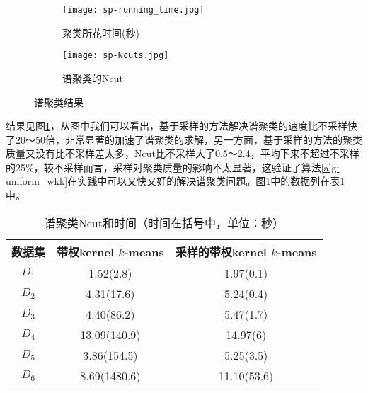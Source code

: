 \begin{figure}[h]
	\begin{subfigure}{.47\linewidth}
		\texttt{[image: sp-running\_time.jpg]}
		\caption{聚类所花时间(秒)}
	\end{subfigure}
	\begin{subfigure}{.47\linewidth}
		\texttt{[image: sp-Ncuts.jpg]}
		\caption{谱聚类的Ncut}
	\end{subfigure}
    \caption{谱聚类结果}
    \label{fig: sp-experiments}
\end{figure}
结果见图\ref{fig: sp-experiments}，从图中我们可以看出，基于采样的方法解决谱聚类的速度比不采样快了20～50倍，非常显著的加速了谱聚类的求解，另一方面，基于采样的方法的聚类质量又没有比不采样差太多，Ncut比不采样大了0.5～2.4，平均下来不超过不采样的25\%，较不采样而言，采样对聚类质量的影响不太显著，这验证了算法\ref{alg: uniform_wkk}在实践中可以又快又好的解决谱聚类问题。图\ref{fig: sp-experiments}中的数据列在表\ref{tab: res_spectral_cls}中。
\begin{table}[h]
	\caption{谱聚类Ncut和时间（时间在括号中，单位：秒）}
	\label{tab: res_spectral_cls}
	\begin{tabular}{ccc}
		\toprule
		数据集 & 带权kernel $k$-means & 采样的带权kernel $k$-means \\
		\midrule
		$D_1$ & 1.52(2.8) & 1.97(0.1) \\
		$D_2$ & 4.31(17.6) & 5.24(0.4) \\
		$D_3$ & 4.40(86.2) & 5.47(1.7) \\
		$D_4$ & 13.09(140.9) & 14.97(6) \\
		$D_5$ & 3.86(154.5) & 5.25(3.5) \\
		$D_6$ & 8.69(1480.6) & 11.10(53.6) \\
		\bottomrule
	\end{tabular}
\end{table}

